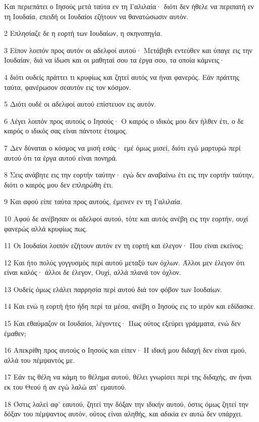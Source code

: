 \par Και περιεπάτει ο Ιησούς μετά ταύτα εν τη Γαλιλαία· διότι δεν ήθελε να περιπατή εν τη Ιουδαία, επειδή οι Ιουδαίοι εζήτουν να θανατώσωσιν αυτόν.
\par 2 Επλησίαζε δε η εορτή των Ιουδαίων, η σκηνοπηγία.
\par 3 Είπον λοιπόν προς αυτόν οι αδελφοί αυτού· Μετάβηθι εντεύθεν και ύπαγε εις την Ιουδαίαν, διά να ίδωσι και οι μαθηταί σου τα έργα σου, τα οποία κάμνεις·
\par 4 διότι ουδείς πράττει τι κρυφίως και ζητεί αυτός να ήναι φανερός. Εάν πράττης ταύτα, φανέρωσον σεαυτόν εις τον κόσμον.
\par 5 Διότι ουδέ οι αδελφοί αυτού επίστευον εις αυτόν.
\par 6 Λέγει λοιπόν προς αυτούς ο Ιησούς· Ο καιρός ο ιδικός μου δεν ήλθεν έτι, ο δε καιρός ο ιδικός σας είναι πάντοτε έτοιμος.
\par 7 Δεν δύναται ο κόσμος να μισή εσάς· εμέ όμως μισεί, διότι εγώ μαρτυρώ περί αυτού ότι τα έργα αυτού είναι πονηρά.
\par 8 Σεις ανάβητε εις την εορτήν ταύτην· εγώ δεν αναβαίνω έτι εις την εορτήν ταύτην, διότι ο καιρός μου δεν επληρώθη έτι.
\par 9 Και αφού είπε ταύτα προς αυτούς, έμεινεν εν τη Γαλιλαία.
\par 10 Αφού δε ανέβησαν οι αδελφοί αυτού, τότε και αυτός ανέβη εις την εορτήν, ουχί φανερώς αλλά κρυφίως πως.
\par 11 Οι Ιουδαίοι λοιπόν εζήτουν αυτόν εν τη εορτή και έλεγον· Που είναι εκείνος;
\par 12 Και ήτο πολύς γογγυσμός περί αυτού μεταξύ των όχλων. Άλλοι μεν έλεγον ότι είναι καλός· άλλοι δε έλεγον, Ουχί, αλλά πλανά τον όχλον.
\par 13 Ουδείς όμως ελάλει παρρησία περί αυτού διά τον φόβον των Ιουδαίων.
\par 14 Και ενώ η εορτή ήτο ήδη περί τα μέσα, ανέβη ο Ιησούς εις το ιερόν και εδίδασκε.
\par 15 Και εθαύμαζον οι Ιουδαίοι, λέγοντες· Πως ούτος εξεύρει γράμματα, ενώ δεν έμαθεν;
\par 16 Απεκρίθη προς αυτούς ο Ιησούς και είπεν· Η ιδική μου διδαχή δεν είναι εμού, αλλά του πέμψαντός με.
\par 17 Εάν τις θέλη να κάμη το θέλημα αυτού, θέλει γνωρίσει περί της διδαχής, αν ήναι εκ του Θεού ή αν εγώ λαλώ απ' εμαυτού.
\par 18 Όστις λαλεί αφ' εαυτού, ζητεί την δόξαν την ιδικήν αυτού, όστις όμως ζητεί την δόξαν του πέμψαντος αυτόν, ούτος είναι αληθής, και αδικία εν αυτώ δεν υπάρχει.
